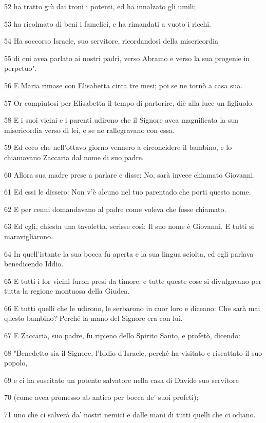 \par 52 ha tratto giù dai troni i potenti, ed ha innalzato gli umili;
\par 53 ha ricolmato di beni i famelici, e ha rimandati a vuoto i ricchi.
\par 54 Ha soccorso Israele, suo servitore, ricordandosi della misericordia
\par 55 di cui avea parlato ai nostri padri, verso Abramo e verso la sua progenie in perpetuo".
\par 56 E Maria rimase con Elisabetta circa tre mesi; poi se ne tornò a casa sua.
\par 57 Or compiutosi per Elisabetta il tempo di partorire, diè alla luce un figliuolo.
\par 58 E i suoi vicini e i parenti udirono che il Signore avea magnificata la sua misericordia verso di lei, e se ne rallegravano con essa.
\par 59 Ed ecco che nell'ottavo giorno vennero a circoncidere il bambino, e lo chiamavano Zaccaria dal nome di suo padre.
\par 60 Allora sua madre prese a parlare e disse: No, sarà invece chiamato Giovanni.
\par 61 Ed essi le dissero: Non v'è alcuno nel tuo parentado che porti questo nome.
\par 62 E per cenni domandavano al padre come voleva che fosse chiamato.
\par 63 Ed egli, chiesta una tavoletta, scrisse così: Il suo nome è Giovanni. E tutti si maravigliarono.
\par 64 In quell'istante la sua bocca fu aperta e la sua lingua sciolta, ed egli parlava benedicendo Iddio.
\par 65 E tutti i lor vicini furon presi da timore; e tutte queste cose si divulgavano per tutta la regione montuosa della Giudea.
\par 66 E tutti quelli che le udirono, le serbarono in cuor loro e diceano: Che sarà mai questo bambino? Perché la mano del Signore era con lui.
\par 67 E Zaccaria, suo padre, fu ripieno dello Spirito Santo, e profetò, dicendo:
\par 68 "Benedetto sia il Signore, l'Iddio d'Israele, perché ha visitato e riscattato il suo popolo,
\par 69 e ci ha suscitato un potente salvatore nella casa di Davide suo servitore
\par 70 (come avea promesso ab antico per bocca de' suoi profeti);
\par 71 uno che ci salverà da' nostri nemici e dalle mani di tutti quelli che ci odiano.
